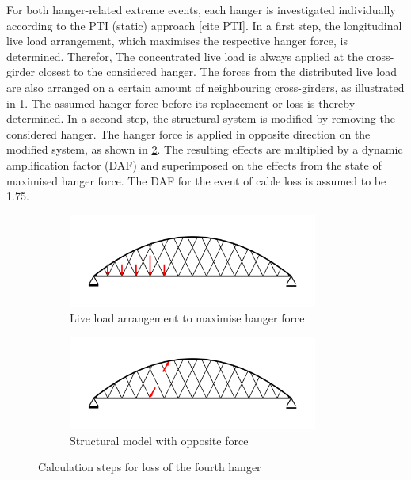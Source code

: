 

For both hanger-related extreme events, each hanger is investigated individually according to the PTI (static) approach [cite PTI]. In a first step, the longitudinal live load arrangement, which maximises the respective hanger force, is determined. Therefor, The concentrated live load is always applied at the cross-girder closest to the considered hanger. The forces from the distributed live load are also arranged on a certain amount of neighbouring cross-girders, as illustrated in \cref{fig:Cable_Loss_1}. The assumed hanger force before its replacement or loss is thereby determined. In a second step, the structural system is modified by removing the considered hanger. The hanger force is applied in opposite direction on the modified system, as shown in \cref{fig:Cable_Loss_2}. The resulting effects are multiplied by a dynamic amplification factor (DAF) and superimposed on the effects from the state of maximised hanger force. The DAF for the event of cable loss is assumed to be 1.75.

\begin{figure}[H]
\centering
\begin{subfigure}{0.5\textwidth}
    \centering
    \includegraphics[trim={0 0.8cm 0 0.8cm},clip, width=0.9\textwidth]{illustrations/figures/cable loss - load arrangement.png}
    \caption{Live load arrangement to maximise hanger force}
    \label{fig:Cable_Loss_1}
\end{subfigure}%
\begin{subfigure}{.5\textwidth}
    \centering
    \includegraphics[trim={0 0.8cm 0 0.8cm},clip, width=0.9\textwidth]{illustrations/figures/cable loss.png}
    \caption{Structural model with opposite force}
    \label{fig:Cable_Loss_2}
\end{subfigure}
\caption{Calculation steps for loss of the fourth hanger}
\label{fig:Cable_Loss}
\end{figure}

